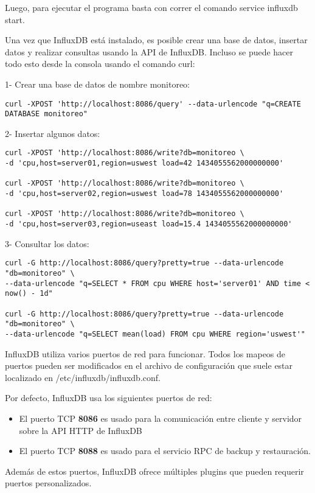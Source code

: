 Luego, para ejecutar el programa basta con correr el comando service influxdb
start.

Una vez que InfluxDB está instalado, es posible crear una base de datos,
insertar datos y realizar consultas usando la API de InfluxDB. Incluso se puede
hacer todo esto desde la consola usando el comando curl:

1- Crear una base de datos de nombre monitoreo:

\begin{lstlisting}
curl -XPOST 'http://localhost:8086/query' --data-urlencode "q=CREATE DATABASE monitoreo"
\end{lstlisting}

2- Insertar algunos datos:

\begin{lstlisting}
curl -XPOST 'http://localhost:8086/write?db=monitoreo \
-d 'cpu,host=server01,region=uswest load=42 1434055562000000000'

curl -XPOST 'http://localhost:8086/write?db=monitoreo \
-d 'cpu,host=server02,region=uswest load=78 1434055562000000000'

curl -XPOST 'http://localhost:8086/write?db=monitoreo \
-d 'cpu,host=server03,region=useast load=15.4 1434055562000000000'
\end{lstlisting}


3- Consultar los datos:

\begin{lstlisting}
curl -G http://localhost:8086/query?pretty=true --data-urlencode "db=monitoreo" \
--data-urlencode "q=SELECT * FROM cpu WHERE host='server01' AND time < now() - 1d"

curl -G http://localhost:8086/query?pretty=true --data-urlencode "db=monitoreo" \
--data-urlencode "q=SELECT mean(load) FROM cpu WHERE region='uswest'"
\end{lstlisting}

InfluxDB utiliza varios puertos de red para funcionar. Todos los mapeos de
puertos pueden ser modificados en el archivo de configuración que suele estar
localizado en /etc/influxdb/influxdb.conf.

Por defecto, InfluxDB usa los siguientes puertos de red:

\begin{itemize}

  \item
  El puerto TCP \textbf{8086} es usado para la comunicación entre cliente y
  servidor sobre la API HTTP de InfluxDB

  \item
  El puerto TCP \textbf{8088} es usado para el servicio RPC de backup y
  restauración.


\end{itemize}


Además de estos puertos, InfluxDB ofrece múltiples plugins que pueden requerir
puertos personalizados. 
